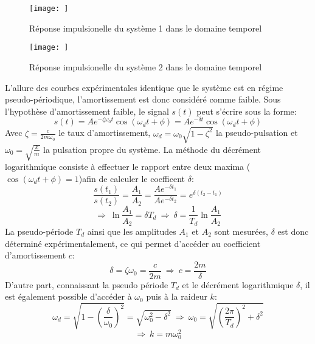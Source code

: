 \begin{figure}
    \centering
    \texttt{[image: ]}
    \caption{Réponse impulsionelle du système 1 dans le domaine temporel}
    \label{fig:graph temp 1}
\end{figure}{}

\begin{figure}
    \centering
    \texttt{[image: ]}
    \caption{Réponse impulsionelle du système 2 dans le domaine temporel}
    \label{fig:graph temp 2}
\end{figure}{}

L'allure des courbes expérimentales identique que le système est en régime pseudo-périodique, l'amortissement est donc considéré comme faible. 
Sous l'hypothèse d'amortissement faible, le signal $s(t)$ peut s'écrire sous la forme: \begin{equation}
    s(t)=Ae^{-\zeta\omega_0t}\cos(\omega_dt+\phi)=Ae^{-\delta t}\cos(\omega_dt+\phi)
\end{equation}
Avec $\zeta=\frac{c}{2m\omega_0}$ le taux d'amortissement, $\omega_d=\omega_0\sqrt{1-\zeta^2}$ la pseudo-pulsation et $\omega_0=\sqrt{\frac{k}{m}}$ la pulsation propre du système.
La méthode du décrément logarithmique consiste à effectuer le rapport entre deux maxima ($\cos(\omega_dt+\phi)=1$)afin de calculer le coefficent $\delta$: \begin{equation*}
    \frac{s(t_1)}{s(t_2)}=\frac{A_1}{A_2}=\frac{Ae^{-\delta t_1}}{Ae^{-\delta t_2}}=e^{\delta(t_2-t_1)}
\end{equation*}
\begin{equation*}
    \Rightarrow~\ln{\frac{A_1}{A_2}}=\delta T_d~\Rightarrow~\delta=\frac{1}{T_d}\ln{\frac{A_1}{A_2}} 
\end{equation*}
La pseudo-période $T_d$ ainsi que les amplitudes $A_1$ et $A_2$ sont mesurées, $\delta$ est donc déterminé expérimentalement, ce qui permet d'accéder au coefficient d'amortissement $c$:
\begin{equation*}
    \delta=\zeta\omega_0=\frac{c}{2m}~\Rightarrow~c=\frac{2m}{\delta}
\end{equation*}
D'autre part, connaissant la pseudo période $T_d$ et le décrément logarithmique $\delta$, il est également possible d'accéder à $\omega_0$ puis à la raideur $k$:
\begin{equation*}
    \omega_d=\sqrt{1-\left(\frac{\delta}{\omega_0}\right)^2}=\sqrt{\omega_0^2-\delta^2}~\Rightarrow~\omega_0=\sqrt{\left(\frac{2\pi}{T_d}\right)^2+\delta^2}
\end{equation*}
\begin{equation*}
    \Rightarrow~k=m\omega_0^2
\end{equation*}
